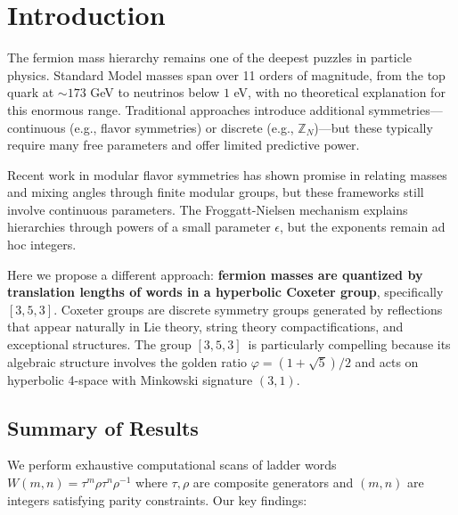 \documentclass[11pt,a4paper]{article}
\newcommand{\tgrp}{\ensuremath{[3,5,3]}}
\begin{document}
\section{Introduction}

The fermion mass hierarchy remains one of the deepest puzzles in particle physics. Standard Model masses span over 11 orders of magnitude, from the top quark at $\sim173$ GeV to neutrinos below $1$ eV, with no theoretical explanation for this enormous range. Traditional approaches introduce additional symmetries—continuous (e.g., flavor symmetries) or discrete (e.g., $\mathbb{Z}_N$)—but these typically require many free parameters and offer limited predictive power.

Recent work in modular flavor symmetries \cite{Feruglio2019, Kobayashi2023} has shown promise in relating masses and mixing angles through finite modular groups, but these frameworks still involve continuous parameters. The Froggatt-Nielsen mechanism \cite{FroggattNielsen1979} explains hierarchies through powers of a small parameter $\epsilon$, but the exponents remain ad hoc integers.

Here we propose a different approach: \textbf{fermion masses are quantized by translation lengths of words in a hyperbolic Coxeter group}, specifically \tgrp. Coxeter groups are discrete symmetry groups generated by reflections that appear naturally in Lie theory, string theory compactifications, and exceptional structures. The group \tgrp\ is particularly compelling because its algebraic structure involves the golden ratio $\varphi = (1+\sqrt{5})/2$ and acts on hyperbolic 4-space with Minkowski signature $(3,1)$.

\subsection{Summary of Results}

We perform exhaustive computational scans of ladder words $W(m,n) = \tau^m \rho \tau^n \rho^{-1}$ where $\tau, \rho$ are composite generators and $(m,n)$ are integers satisfying parity constraints. Our key findings:
\end{document}
